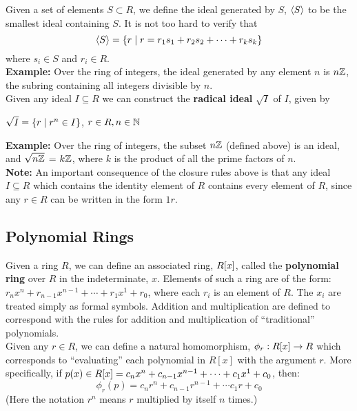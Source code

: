 \documentclass[twoside]{report}
\begin{document}
Given a set of elements $S \subset R$, we define the ideal generated
by $S$, $\langle S\rangle$ to be the smallest ideal containing $S$.  It is
not too hard to verify that 
$$\langle S\rangle = \{r \mid r = r_1s_1 + r_2s_2 + \cdots + r_ks_k\}$$ 
where $s_i \in S$ and $r_i \in R$.\\

\textbf{Example:} Over the ring of integers, the ideal generated by
any element $n$ is $n\mathbb{Z}$, the subring containing all integers
divisible by $n$.\\

Given any ideal $I \subseteq R$ we can construct the \textbf{radical
  ideal} $\sqrt{I}$ of $I$, given by\\

\centerline{$\sqrt{I} = \{r \mid r^n \in I\}$, $r \in R, n \in
  \mathbb{N}$} \vspace{\baselineskip}

\textbf{Example:} Over the ring of integers, the subset $n\mathbb{Z}$
(defined above) is an ideal, and $\sqrt{n\mathbb{Z}}$ = $k\mathbb{Z}$,
where $k$ is the product of all the prime factors of
$n$.\\

\textbf{Note:} An important consequence of the closure rules above is
that any ideal $I \subseteq R$ which contains the identity element of
$R$ contains every element of $R$, since any $r \in R$ can be written
in the form $1r$.

\subsection{Polynomial Rings}

Given a ring $R$, we can define an associated ring, $R[x]$, called
the \textbf{polynomial ring} over $R$ in the indeterminate, $x$.
Elements of such a ring are of the form: $r_nx^n + r_{n-1}x^{n-1} +
\cdots + r_1x^1 + r_0$, where each $r_i$ is an element of $R$.  The
$x_i$ are treated simply as formal symbols. Addition and
multiplication are defined to correspond with the rules for addition
and multiplication of ``traditional'' polynomials. \\

Given any $r \in R$, we can define a natural homomorphism, $\phi_r:
R[x] \rightarrow R$ which corresponds to ``evaluating'' each
polynomial in $R[x]$ with the argument $r$.  More specifically, if
$p(x) \in R[x] = c_nx^n + c_{n-1}x^{n-1} + \cdots + c_1x^1 + c_0$,
then:
$$\phi_r(p) = c_nr^n + c_{n-1}r^{n-1} + \cdots c_1r + c_0$$  
(Here the notation $r^n$ means $r$ multiplied by itself $n$ times.)\\
\end{document}
